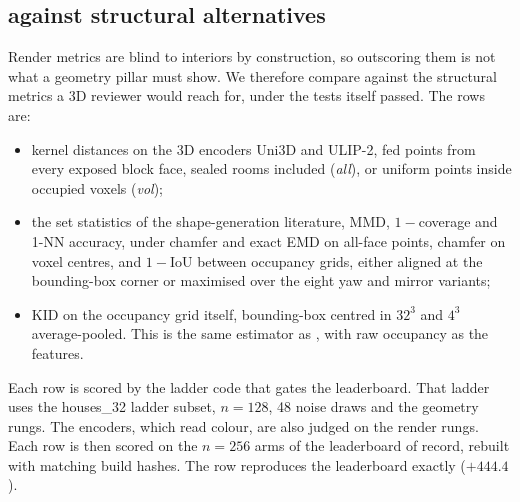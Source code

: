 \subsection{\vkid{} against structural alternatives}
\label{app:headtohead}

Render metrics are blind to interiors by construction, so outscoring them is not what a
geometry pillar must show. We therefore compare \vkid{} against the structural metrics a
3D reviewer would reach for, under the tests \vkid{} itself passed. The rows are:
\begin{itemize}
\item kernel distances on the 3D encoders Uni3D and ULIP-2, fed points from every exposed
  block face, sealed rooms included (\emph{all}), or uniform points inside occupied voxels
  (\emph{vol});
\item the set statistics of the shape-generation literature, MMD, $1-$coverage and
  1-NN accuracy, under chamfer and exact EMD on all-face points, chamfer on voxel centres,
  and $1-$IoU between occupancy grids, either aligned at the bounding-box corner or
  maximised over the eight yaw and mirror variants;
\item KID on the occupancy grid itself, bounding-box centred in $32^3$ and $4^3$
  average-pooled. This is the same estimator as \vkid{}, with raw occupancy as the
  features.
\end{itemize}

Each row is scored by the ladder code that gates the leaderboard. That ladder uses the
houses\_32 ladder subset, $n{=}128$, 48 noise draws and the geometry rungs. The encoders,
which read colour, are also judged on the render rungs. Each row is then scored on the
$n{=}256$ arms of the leaderboard of record, rebuilt with matching build hashes. The
\vkid{} row reproduces the leaderboard exactly ($+444.4$).

